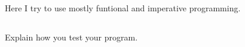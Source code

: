\documentclass{article}
\begin{document}
\subsection{}

Here I try to use mostly funtional and imperative programming.  

\subsection{}


Explain how you test your program.


\section{}




\subsection{}


\end{document}

